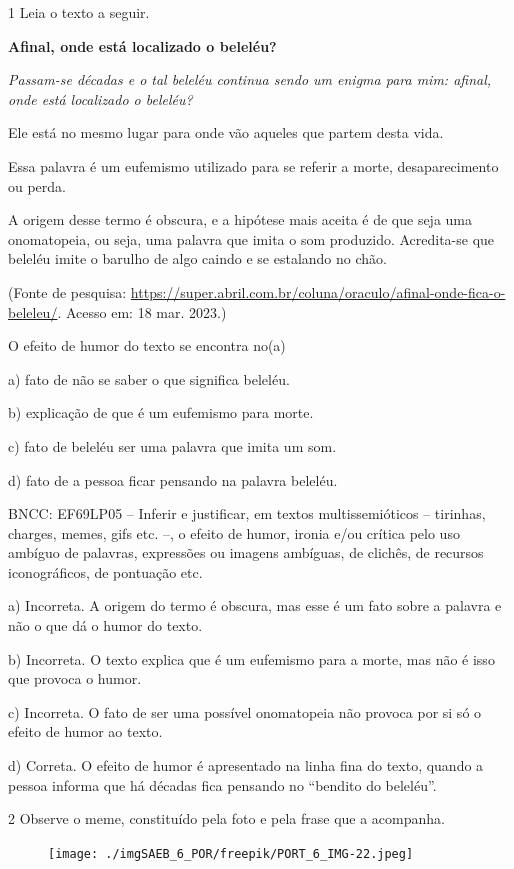
\num{1} Leia o texto a seguir.

\textbf{Afinal, onde está localizado o beleléu?}

\emph{Passam-se décadas e o tal beleléu continua sendo um enigma para
mim: afinal, onde está localizado o beleléu?}

Ele está no mesmo lugar para onde vão aqueles que partem desta vida.

Essa palavra é um eufemismo utilizado para se referir a morte,
desaparecimento ou perda.

A origem desse termo é obscura, e a hipótese mais aceita é de que seja
uma onomatopeia, ou seja, uma palavra que imita o som produzido.
Acredita-se que beleléu imite o barulho de algo caindo e se estalando no
chão.

(Fonte de pesquisa:
\url{https://super.abril.com.br/coluna/oraculo/afinal-onde-fica-o-beleleu/}.
Acesso em: 18 mar. 2023.)

O efeito de humor do texto se encontra no(a)

a) fato de não se saber o que significa beleléu.

b) explicação de que é um eufemismo para morte.

c) fato de beleléu ser uma palavra que imita um som.

d) fato de a pessoa ficar pensando na palavra beleléu.

BNCC: EF69LP05 -- Inferir e justificar, em textos multissemióticos --
tirinhas, charges, memes, gifs etc. --, o efeito de humor, ironia e/ou
crítica pelo uso ambíguo de palavras, expressões ou imagens ambíguas, de
clichês, de recursos iconográficos, de pontuação etc.

a) Incorreta. A origem do termo é obscura, mas esse é um fato sobre a
palavra e não o que dá o humor do texto.

b) Incorreta. O texto explica que é um eufemismo para a morte, mas não é
isso que provoca o humor.

c) Incorreta. O fato de ser uma possível onomatopeia não provoca por si
só o efeito de humor ao texto.

d) Correta. O efeito de humor é apresentado na linha fina do texto,
quando a pessoa informa que há décadas fica pensando no ``bendito do
beleléu''.

\num{2} Observe o meme, constituído pela foto e pela frase que a
acompanha.

\begin{figure}
\texttt{[image: ./imgSAEB\_6\_POR/freepik/PORT\_6\_IMG-22.jpeg]}
\end{figure}

